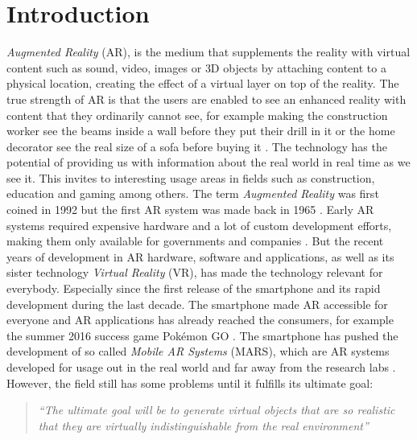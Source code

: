\section{Introduction}
\textit{Augmented Reality} (AR), is the medium that supplements the reality with virtual content such as sound, video, images or 3D objects \cite{azuma1997survey} by attaching content to a physical location, creating the effect of a virtual layer on top of the reality. The true strength of AR is that the users are enabled to see an enhanced reality with content that they ordinarily cannot see, for example making the construction worker see the beams inside a wall before they put their drill in it or the home decorator see the real size of a sofa before buying it \cite{venturebeatWalls, newatlasIkea}. The technology has the potential of providing us with information about the real world in real time as we see it. This invites to interesting usage areas in fields such as construction, education and gaming among others. 
The term \textit{Augmented Reality} was first coined in 1992 \cite{caudell1992augmented} but the first AR system was made back in 1965 \cite{sutherland1968head}. Early AR systems required expensive hardware and a lot of custom development efforts, making them only available for governments and companies \cite{azuma2016most}. But the recent years of development in AR hardware, software and applications, as well as its sister technology \textit{Virtual Reality} (VR), has made the technology relevant for everybody. Especially since the first release of the smartphone and its rapid development during the last decade. The smartphone made AR accessible for everyone and AR applications has already reached the consumers, for example the summer 2016 success game Pok\'emon GO \cite{azuma2016most}. The smartphone has pushed the development of so called \textit{Mobile AR Systems} (MARS), which are AR systems developed for usage out in the real world and far away from the research labs \cite{hollerer2004mobile}. However, the field still has some problems until it fulfills its ultimate goal:
\begin{quote}
\textit{``The ultimate goal will be to generate virtual objects that are so realistic that they are virtually indistinguishable from the real environment''} \cite{azuma1997survey}
\end{quote} 

